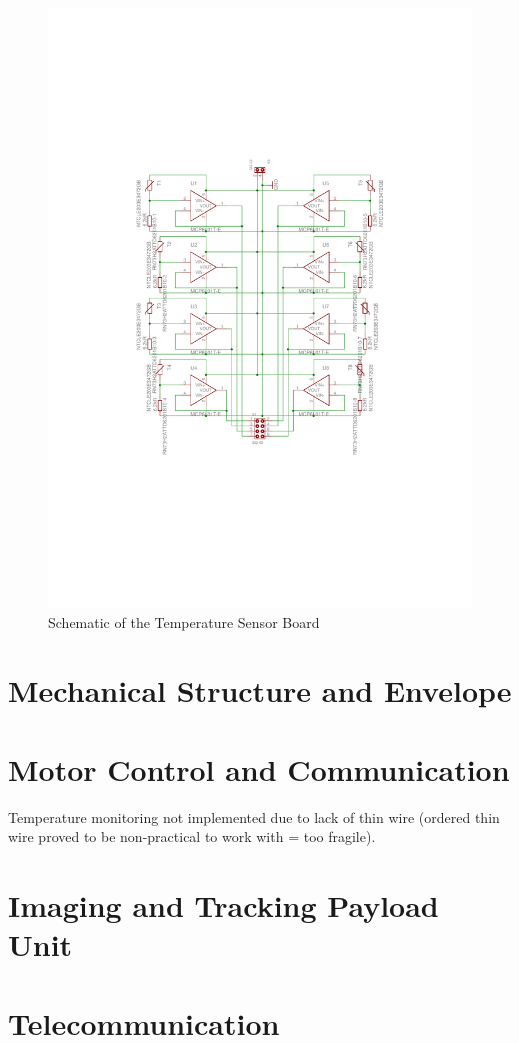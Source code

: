 \begin{figure}[H]
\centering
\includegraphics[width=\textwidth]{figures/fig_Schematic_TS}
\caption{Schematic of the Temperature Sensor Board}
\label{fig:Schematic_TS}
\end{figure}


\section{Mechanical Structure and Envelope}

\section{Motor Control and Communication}

Temperature monitoring not implemented due to lack of thin wire (ordered thin wire proved to be non-practical to work with = too fragile).


\section{Imaging and Tracking Payload Unit}

\section{Telecommunication}
